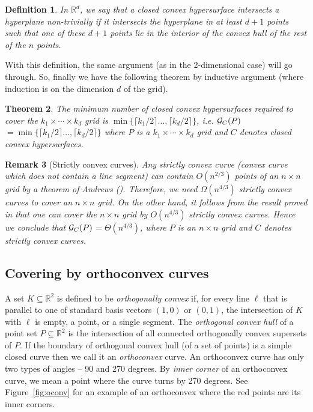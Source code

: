 \documentclass[
final
]{dmtcs-episciences}
\numberwithin{equation}{subsection}
\newtheorem{defn}{Definition}%
\newtheorem{thm}[defn]{Theorem}%
\newtheorem{rmk}[defn]{Remark}
\newcommand{\ga}{${\cal G}_C(P)$}
\begin{document}
\begin{defn}
	In $\mathbb{R}^d$, we say that a closed convex hypersurface intersects a hyperplane non-trivially if it intersects the hyperplane in at least $d+1$ points such that one of these $d+1$ points lie in the interior of the convex hull of the rest of the $n$ points.
\end{defn}
With this definition, the same argument (as in the 2-dimensional case) will go through. So, finally we have the following theorem by inductive argument (where induction is on the dimension $d$ of the grid).
\begin{thm}
	The minimum number of closed convex hypersurfaces required to cover the $k_1\times\cdots\times k_d$
	grid is $\min{\{\lceil k_1/2\rceil \ldots ,\lceil k_d/2\rceil \}}$, i.e. \ga $ = \min{\{\lceil k_1/2\rceil \ldots ,\lceil k_d/2\rceil \}}$ where $P$ is a $k_1\times\cdots\times k_d$ grid and $C$ denotes closed convex hypersurfaces.
\end{thm}

\begin{rmk}[Strictly convex curves]
	Any strictly convex curve (convex curve which does not contain a line segment) can contain $O(n^{2/3})$ points of an $n\times n$ grid by a theorem of Andrews (\cite{andrews}). Therefore, we need $\Omega (n^{4/3})$ strictly convex curves to cover an $n\times n$ grid. On the other hand, it follows from the result proved in \cite{har} that one can cover the $n\times n$ grid by $O(n^{4/3})$ strictly convex curves. Hence we conclude that \ga $ =\Theta (n^{4/3})$, where $P$ is an $n\times n$ grid and $C$ denotes strictly convex curves.
\end{rmk}

\subsection{Covering by orthoconvex curves}
\noindent
A set $K \subseteq \mathbb{R}^2$ is defined to be {\em orthogonally convex} if, for every line $\ell$ that is parallel to one of standard basis vectors $(1,0)$ or $(0,1)$, the intersection of $K$ with $\ell$ is empty, a point, or a single segment. The {\em orthogonal convex hull} of a point set $P\subseteq\mathbb{R}^2$ is the intersection of all connected orthogonally convex supersets of $P$.	If the boundary of orthogonal convex hull (of a set of points) is a simple closed curve then we call it an {\em orthoconvex} curve. An orthoconvex curve has only two types of angles -- 90 and 270 degrees. By {\em inner corner} of an orthoconvex curve, we mean a point where the curve turns by 270 degrees. See Figure~\ref{fig:oconv} for an example of an orthoconvex where the red points are its inner corners.
\end{document}
